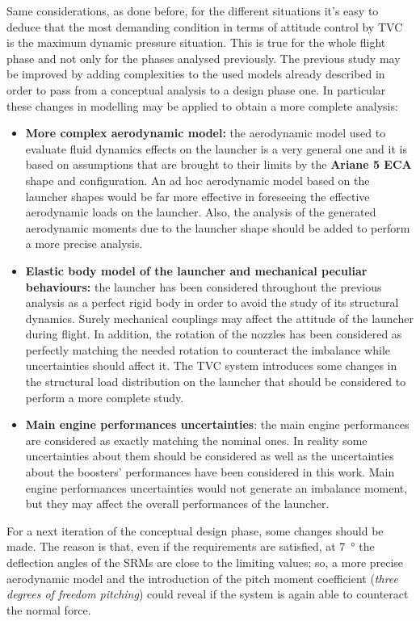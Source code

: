\documentclass[12pt,fleqn,openany]{book} %
\begin{document}
 Same considerations, as done before, for the different situations it's easy to deduce that the most demanding condition in terms of attitude control by TVC is the maximum dynamic pressure situation. This is true for the whole flight phase and not only for the phases analysed previously.
 \newpage \noindent The previous study may be improved by adding complexities to the used models already described in order to pass from a conceptual analysis to a design phase one. In particular these changes in modelling may be applied to obtain a more complete analysis:
 \begin{itemize}
  \item \textbf{More complex aerodynamic model:} the aerodynamic model used to evaluate fluid dynamics effects on the launcher is a very general one and it is based on assumptions that are brought to their limits by the \textbf{Ariane 5 ECA} shape and configuration. An ad hoc aerodynamic model based on the launcher shapes would be far more effective in foreseeing the effective aerodynamic loads on the launcher. Also, the analysis of the generated aerodynamic moments due to the launcher shape should be added to perform a more precise analysis.
  \item \textbf{Elastic body model of the launcher and mechanical peculiar behaviours:} the launcher has been considered throughout the previous analysis as a perfect rigid body in order to avoid the study of its structural dynamics. Surely mechanical couplings may affect the attitude of the launcher during flight. In addition, the rotation of the nozzles has been considered as perfectly matching the needed rotation to counteract the imbalance while uncertainties should affect it. The TVC system introduces some changes in the structural load distribution on the launcher that should be considered to perform a more complete study. 
  \item \textbf{Main engine performances uncertainties}: the main engine performances are considered as exactly matching the nominal ones. In reality some uncertainties about them should be considered as well as the uncertainties about the boosters’ performances have been considered in this work. Main engine performances uncertainties would not generate an imbalance moment, but they may affect the overall performances of the launcher.
 \end{itemize}
 For a next iteration of the conceptual design phase, some changes should be made. The reason is that, even if the requirements are satisfied, at \SI{7}{\degree} the deflection angles of the SRMs are close to the limiting values; so, a more precise aerodynamic model and the introduction of the pitch moment coefficient (\textit{three degrees of freedom pitching}) could reveal if the system is again able to counteract the normal force. 
\end{document}
